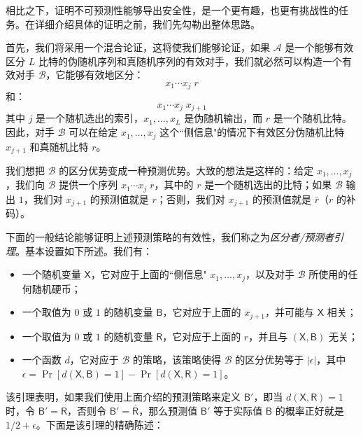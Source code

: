 相比之下，证明不可预测性能够导出安全性，是一个更有趣，也更有挑战性的任务。在详细介绍具体的证明之前，我们先勾勒出整体思路。

首先，我们将采用一个混合论证，这将使我们能够论证，如果 $\mathcal{A}$ 是一个能够有效区分 $L$ 比特的伪随机序列和真随机序列的有效对手，我们就必然可以构造一个有效对手 $\mathcal{B}$，它能够有效地区分：
\[
x_1\cdots x_j\;r
\]
和：
\[
x_1\cdots x_j\;x_{j+1}
\]
其中 $j$ 是一个随机选出的索引，$x_1,\dots,x_L$ 是伪随机输出，而 $r$ 是一个随机比特。因此，对手 $\mathcal{B}$ 可以在给定 $x_1,\dots,x_j$ 这个``侧信息"的情况下有效区分伪随机比特 $x_{j+1}$ 和真随机比特 $r$。

我们想把 $\mathcal{B}$ 的区分优势变成一种预测优势。大致的想法是这样的：给定 $x_1,\dots,x_j$，我们向 $\mathcal{B}$ 提供一个序列 $x_1\cdots x_j\;r$，其中的 $r$ 是一个随机选出的比特；如果 $\mathcal{B}$ 输出 $1$，我们对 $x_{j+1}$ 的预测值就是 $r$；否则，我们对 $x_{j+1}$ 的预测值就是 $\bar{r}$（$r$ 的补码）。

下面的一般结论能够证明上述预测策略的有效性，我们称之为\emph{区分者/预测者引理}。基本设置如下所述。我们有：
\begin{itemize}
	\item 一个随机变量 $\boldsymbol{\mathsf{X}}$，它对应于上面的``侧信息" $x_1,\dots,x_j$，以及对手 $\mathcal{B}$ 所使用的任何随机硬币；
	\item 一个取值为 $0$ 或 $1$ 的随机变量 $\boldsymbol{\mathsf{B}}$，它对应于上面的 $x_{j+1}$，并可能与 $\boldsymbol{\mathsf{X}}$ 相关；
	\item 一个取值为 $0$ 或 $1$ 的随机变量 $\boldsymbol{\mathsf{R}}$，它对应于上面的 $r$，并且与 $(\boldsymbol{\mathsf{X}},\boldsymbol{\mathsf{B}})$ 无关；
	\item 一个函数 $d$，它对应于 $\mathcal{B}$ 的策略，该策略使得 $\mathcal{B}$ 的区分优势等于 $|\epsilon|$，其中 $\epsilon=\Pr[d(\boldsymbol{\mathsf{X}},\boldsymbol{\mathsf{B}})=1]-\Pr[d(\boldsymbol{\mathsf{X}},\boldsymbol{\mathsf{R}})=1]$。
\end{itemize}
该引理表明，如果我们使用上面介绍的预测策略来定义 $\boldsymbol{\mathsf{B}}'$，即当 $d(\boldsymbol{\mathsf{X}},\boldsymbol{\mathsf{R}})=1$ 时，令 $\boldsymbol{\mathsf{B}}'=\boldsymbol{\mathsf{R}}$，否则令 $\boldsymbol{\mathsf{B}}'=\boldsymbol{\mathsf{\overline R}}$，那么预测值 $\boldsymbol{\mathsf{B}}'$ 等于实际值 $\boldsymbol{\mathsf{B}}$ 的概率正好就是 $1/2+\epsilon$。下面是该引理的精确陈述：

